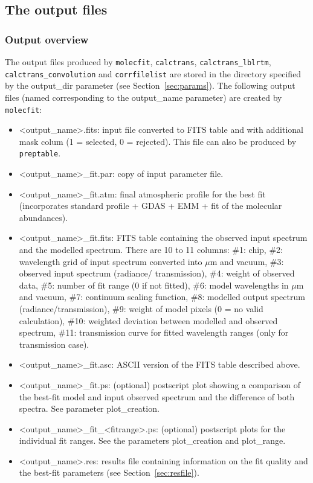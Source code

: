 \subsection{The output files}\label{sec:output}
\subsubsection{Output overview}\label{sec:outputfiles}
\sloppy The output files produced by {\tt molecfit}, {\tt calctrans},
{\tt calctrans\_lblrtm}, {\tt calctrans\_convolution} and
{\tt corrfilelist} are stored in the directory specified by the
{\sc output\_dir} parameter (see Section~\ref{sec:params}). The following
output files (named corresponding to the {\sc output\_name} parameter) are
created by {\tt molecfit}:
\begin{itemize}
\item <{\sc output\_name}>.fits: input file converted to FITS table and with
additional mask colum (1 = selected, 0 = rejected). This file can also be
produced by {\tt preptable}.
\item <{\sc output\_name}>\_fit.par: copy of input parameter file.
\item <{\sc output\_name}>\_fit.atm: final atmospheric profile for the best fit
(incorporates standard profile + \ac{GDAS} + \ac{EMM} + fit of the
molecular abundances).
\item <{\sc output\_name}>\_fit.fits: FITS table containing the observed input
spectrum and the modelled spectrum. There are 10 to 11 columns:
\#1: chip, \#2: wavelength grid of input spectrum converted into $\mu$m and
vacuum, \#3: observed input spectrum (radiance/ transmission), \#4: weight of
observed data, \#5: number of fit range (0 if not fitted), \#6: model
wavelengths in $\mu$m and vacuum, \#7: continuum scaling function,
\#8: modelled output spectrum (radiance/transmission), \#9: weight of model
pixels (0 = no valid calculation), \#10: weighted deviation between modelled
and observed spectrum, \#11: transmission curve for fitted wavelength ranges
(only for transmission case).
\item <{\sc output\_name}>\_fit.asc: ASCII version of the FITS table described
above.
\item <{\sc output\_name}>\_fit.ps: (optional) postscript plot showing a
comparison of the best-fit model and input observed spectrum and the difference
of both spectra. See parameter {\sc plot\_creation}.
\item <{\sc output\_name}>\_fit\_<fitrange>.ps: (optional) postscript plots
for the individual fit ranges. See the parameters {\sc plot\_creation} and
{\sc plot\_range}.
\item <{\sc output\_name}>.res: results file containing information on the fit
quality and the best-fit parameters (see Section~\ref{sec:resfile}).
\end{itemize}
